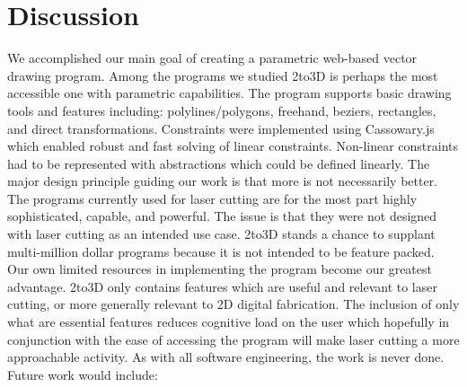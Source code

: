 \section{Discussion}

We accomplished our main goal of creating a parametric web-based vector drawing program. Among the programs we studied 2to3D is perhaps the most accessible one with parametric capabilities. The program supports basic drawing tools and features including: polylines/polygons, freehand, beziers, rectangles, and direct transformations. Constraints were implemented using Cassowary.js which enabled robust and fast solving of linear constraints. Non-linear constraints had to be represented with abstractions which could be defined linearly. The major design principle guiding our work is that more is not necessarily better. The programs currently used for laser cutting are for the most part highly sophisticated, capable, and powerful. The issue is that they were not designed with laser cutting as an intended use case. 2to3D stands a chance to supplant multi-million dollar programs because it is not intended to be feature packed. Our own limited resources in implementing the program become our greatest advantage. 2to3D only contains features which are useful and relevant to laser cutting, or more generally relevant to 2D digital fabrication. The inclusion of only what are essential features reduces cognitive load on the user which hopefully in conjunction with the ease of accessing the program will make laser cutting a more approachable activity. As with all software engineering, the work is never done. Future work would include:

